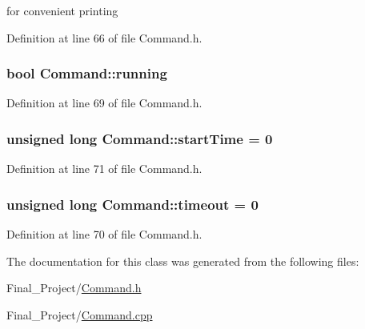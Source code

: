 for convenient printing 



Definition at line 66 of file Command.\-h.

\hypertarget{classCommand_a8e31897f049af332a2421c9721fda18b}{
\subsubsection[{running}]{\setlength{\rightskip}{0pt plus 5cm}bool Command\-::running\hspace{0.3cm}{\ttfamily [private]}}}\label{classCommand_a8e31897f049af332a2421c9721fda18b}


Definition at line 69 of file Command.\-h.

\hypertarget{classCommand_af537856a06286a62d7200d84f901c72e}{
\subsubsection[{start\-Time}]{\setlength{\rightskip}{0pt plus 5cm}unsigned long Command\-::start\-Time = 0\hspace{0.3cm}{\ttfamily [private]}}}\label{classCommand_af537856a06286a62d7200d84f901c72e}


Definition at line 71 of file Command.\-h.

\hypertarget{classCommand_a687b30a3d41c93f91dfba5a88c98f270}{
\subsubsection[{timeout}]{\setlength{\rightskip}{0pt plus 5cm}unsigned long Command\-::timeout = 0\hspace{0.3cm}{\ttfamily [private]}}}\label{classCommand_a687b30a3d41c93f91dfba5a88c98f270}


Definition at line 70 of file Command.\-h.



The documentation for this class was generated from the following files\-:\begin{DoxyCompactItemize}
\item 
Final\-\_\-\-Project/\hyperlink{Command_8h}{Command.\-h}\item 
Final\-\_\-\-Project/\hyperlink{Command_8cpp}{Command.\-cpp}\end{DoxyCompactItemize}
